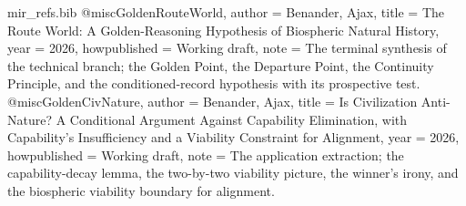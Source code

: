 \begin{filecontents}[overwrite]{mir_refs.bib}
@misc{GoldenRouteWorld,
  author       = {Benander, Ajax},
  title        = {The Route World: A Golden-Reasoning Hypothesis of Biospheric Natural History},
  year         = {2026},
  howpublished = {Working draft},
  note         = {The terminal synthesis of the technical branch; the Golden Point,
                  the Departure Point, the Continuity Principle, and the
                  conditioned-record hypothesis with its prospective test.}
}
@misc{GoldenCivNature,
  author       = {Benander, Ajax},
  title        = {Is Civilization Anti-Nature? A Conditional Argument Against Capability Elimination, with Capability's Insufficiency and a Viability Constraint for Alignment},
  year         = {2026},
  howpublished = {Working draft},
  note         = {The application extraction; the capability-decay lemma, the
                  two-by-two viability picture, the winner's irony, and the
                  biospheric viability boundary for alignment.}
}


\end{filecontents}
